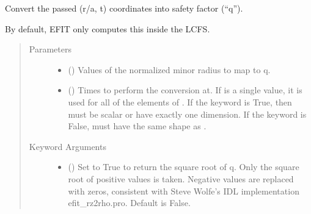 \documentclass[letterpaper,10pt,english]{sphinxmanual}
\begin{document}
\begin{fulllineitems}
\begin{fulllineitems}
\end{fulllineitems}


\begin{fulllineitems}
\label{\detokenize{eqtools:eqtools.core.Equilibrium.roa2q}}
Convert the passed (r/a, t) coordinates into safety factor (“q”).

By default, EFIT only computes this inside the LCFS.
\begin{quote}\begin{description}
\item[{Parameters}] \leavevmode\begin{itemize}
\item {} 
 () \textendash{} Values of the normalized minor
radius to map to q.

\item {} 
 () \textendash{} Times to perform the conversion at.
If  is a single value, it is used for all of the elements of
. If the  keyword is True, then  must be scalar
or have exactly one dimension. If the  keyword is False,
 must have the same shape as .

\end{itemize}

\item[{Keyword Arguments}] \leavevmode\begin{itemize}
\item {} 
 () \textendash{} Set to True to return the square root of q.
Only the square root of positive values is taken. Negative
values are replaced with zeros, consistent with Steve Wolfe’s
IDL implementation efit\_rz2rho.pro. Default is False.


\end{itemize}
\end{description}
\end{quote}
\end{fulllineitems}
\end{fulllineitems}
\end{document}
